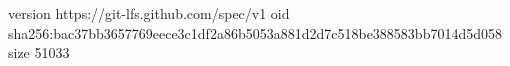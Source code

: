 version https://git-lfs.github.com/spec/v1
oid sha256:bac37bb3657769eece3c1df2a86b5053a881d2d7c518be388583bb7014d5d058
size 51033
